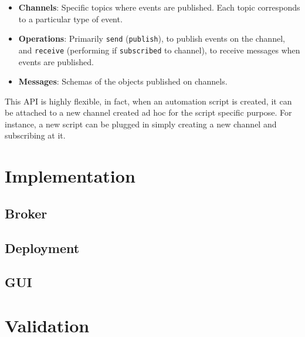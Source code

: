 \documentclass[12pt,a4paper,openright,twoside]{book}
\begin{document}
\begin{itemize}
    \item \textbf{Channels}: Specific topics where events are published. Each topic corresponds to a particular type of event.
    \item \textbf{Operations}: Primarily \texttt{send} (\texttt{publish}), to publish events on the channel, and \texttt{receive} (performing if \texttt{subscribed} to channel), to receive messages when events are published.
    \item \textbf{Messages}: Schemas of the objects published on channels.
\end{itemize}


This API is highly flexible, in fact, when an automation script is created, it can be attached to a new channel created ad hoc for the script specific purpose.
%
For instance, a new script can be plugged in simply  creating a new channel and subscribing at it.




\chapter{Implementation}%
\label{chap:implementation}

\section{Broker}

\section{Deployment}

\section{GUI}



\chapter{Validation}%
\label{chap:validation}
\end{document}
